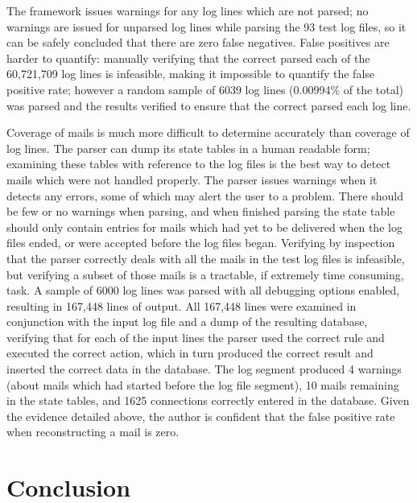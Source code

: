 \documentclass[draft]{svmult}
\newcommand{\numberOFlogFILES}[0]{%
    93%
}
\begin{document}
The framework issues warnings for any log lines which are not parsed; no
warnings are issued for unparsed log lines while parsing the
\numberOFlogFILES{} test log files, so it can be safely concluded that
there are zero false negatives.  False positives are harder to quantify:
manually verifying that the correct \regex{} parsed each of the 60,721,709
log lines is infeasible, making it impossible to quantify the false
positive rate; however a random sample of 6039 log lines (0.00994\% of the
total) was parsed and the results verified to ensure that the correct
\regex{} parsed each log line.

Coverage of mails is much more difficult to determine accurately than
coverage of log lines.  The parser can dump its state tables in a human
readable form; examining these tables with reference to the log files is
the best way to detect mails which were not handled properly.  The parser
issues warnings when it detects any errors, some of which may alert the
user to a problem.  There should be few or no warnings when parsing, and
when finished parsing the state table should only contain entries for mails
which had yet to be delivered when the log files ended, or were accepted
before the log files began.  Verifying by inspection that the parser
correctly deals with all the mails in the test log files is infeasible, but
verifying a subset of those mails is a tractable, if extremely time
consuming, task.  A sample of 6000 log lines was parsed with all debugging
options enabled, resulting in 167,448 lines of output.  All 167,448 lines
were examined in conjunction with the input log file and a dump of the
resulting database, verifying that for each of the input lines the parser
used the correct rule and executed the correct action, which in turn
produced the correct result and inserted the correct data in the database.
The log segment produced 4 warnings (about mails which had started before
the log file segment), 10 mails remaining in the state tables, and 1625
connections correctly entered in the database.  Given the evidence detailed
above, the author is confident that the false positive rate when
reconstructing a mail is zero.


\section{Conclusion}
\end{document}
